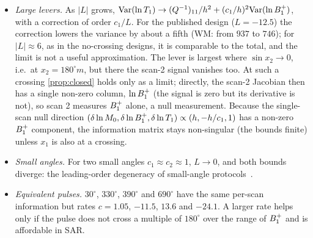 \begin{itemize}
\item \emph{Large levers.} As $|L|$ grows, $\mathrm{Var}(\ln T_1)\to(Q^{-1})_{11}/h^2+(c_1/h)^2\mathrm{Var}(\ln B_1^{+})$, with a correction of
  order $c_1/L$. For the published design ($L=-12.5$) the correction lowers the variance by about a
  fifth (WM: from $937$ to $746$); for $|L|\approx6$, as in the no-crossing designs, it is comparable to the
  total, and the limit is not a useful approximation. The lever is
  largest where $\sin x_2\to0$, i.e.\ at $x_2=180^\circ m$, but there the scan-2 signal vanishes too. At such a
  crossing \cref{prop:closed} holds only as a limit; directly, the scan-2 Jacobian then has a
  single non-zero column, $\ln B_1^{+}$ (the signal is zero but its derivative is not), so scan 2 measures
  $B_1^{+}$ alone, a null measurement. Because the single-scan null direction
  $(\delta\ln M_0,\delta\ln B_1^{+},\delta\ln T_1)\propto(h,-h/c_1,1)$ has a non-zero $B_1^{+}$ component, the information matrix stays
  non-singular (the bounds finite) unless $x_1$ is also at a crossing.
\item \emph{Small angles.} For two small angles $c_1\approx c_2\approx1$, $L\to0$, and both bounds diverge:
  the leading-order degeneracy of small-angle protocols~\cite{technote}.
\item \emph{Equivalent pulses.} $30^\circ$, $330^\circ$, $390^\circ$ and $690^\circ$ have the same per-scan information
  but rates $c=1.05$, $-11.5$, $13.6$ and $-24.1$. A larger rate helps only if the pulse does not
  cross a multiple of $180^\circ$ over the range of $B_1^{+}$ and is affordable in SAR.
\end{itemize}

